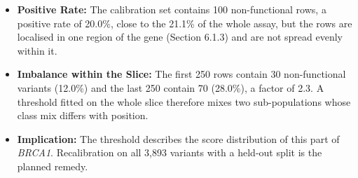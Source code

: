 \begin{itemize}
\item \textbf{Positive Rate:} The calibration set contains 100 non-functional rows, a positive rate of 20.0\%, close to the 21.1\% of the whole assay, but the rows are localised in one region of the gene (Section 6.1.3) and are not spread evenly within it.
\item \textbf{Imbalance within the Slice:} The first 250 rows contain 30 non-functional variants (12.0\%) and the last 250 contain 70 (28.0\%), a factor of 2.3. A threshold fitted on the whole slice therefore mixes two sub-populations whose class mix differs with position.
\item \textbf{Implication:} The threshold describes the score distribution of this part of \textit{BRCA1}. Recalibration on all 3,893 variants with a held-out split is the planned remedy.
\end{itemize}

